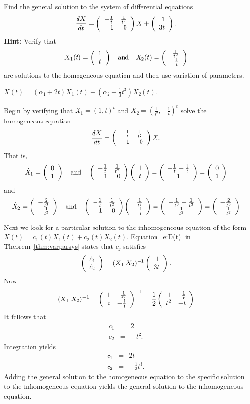 \documentclass{ximera}
\begin{document}
\begin{exercise}  \label{c17.3.3}
Find the general solution to the system of differential equations
\[
\frac{dX}{dt}= \left(\begin{array}{rr} -\frac{1}{t} & \frac{1}{t^2}\\ 1 &0\end{array}\right)X+\left(\begin{array}{r} 1 \\ 3t\end{array}\right).
\]
{\bf Hint:} Verify that 
\[
X_1(t) = \left(\begin{array}{c} 1 \\ t\end{array}\right) \quad\mbox{and}\quad X_2(t) = \left(\begin{array}{r} \frac{1}{t^2} \\ -\frac{1}{t}\end{array}\right)
\]
are solutions to the homogeneous equation and then use variation of parameters.

\begin{solution}
\ans $X(t) = (\alpha_1+2t)X_1(t) + 
\left(\alpha_2-\frac{1}{3}t^3 \right)X_2(t)$.

\soln  Begin by verifying that $X_1=(1,t)^t$ and 
$X_2=(\frac{1}{t^2},-\frac{1}{t})^t$ solve the homogeneous
equation
\[
\frac{dX}{dt}= \left(\begin{array}{rr} -\frac{1}{t} & \frac{1}{t^2}\\ 1 &0\end{array}\right)X.
\]
That is,
\[
\dot{X}_1 = \left(\begin{array}{c} 0 \\ 1\end{array}\right) \quad\mbox{and}\quad 
\left(\begin{array}{rr} -\frac{1}{t} & \frac{1}{t^2}\\ 1 &0\end{array}\right)\left(\begin{array}{c} 1 \\ t\end{array}\right) = 
\left(\begin{array}{c} -\frac{1}{t}+\frac{1}{t} \\ 1\end{array}\right) = \left(\begin{array}{c} 0 \\ 1\end{array}\right)
\]
and 
\[
\dot{X}_2 = \left(\begin{array}{r} -\frac{2}{t^3} \\ \frac{1}{t^2}\end{array}\right) \quad\mbox{and}\quad 
\left(\begin{array}{rr} -\frac{1}{t} & \frac{1}{t^2}\\ 1 &0\end{array}\right)
\left(\begin{array}{r} \frac{1}{t^2} \\ -\frac{1}{t}\end{array}\right) = 
\left(\begin{array}{c} -\frac{1}{t^3}-\frac{1}{t^3} \\ \frac{1}{t^2}\end{array}\right) 
= \left(\begin{array}{r} -\frac{2}{t^3} \\ \frac{1}{t^2}\end{array}\right)
\]

Next we look for a particular solution to the inhomogeneous equation of 
the form $X(t)=c_1(t)X_1(t)+c_2(t)X_2(t)$.  Equation~\eqref{e:D(t)} in
Theorem~\ref{thm:varparsys} states that $c_j$ satisfies
\[
\left(\begin{array}{r} \dot{c}_1 \\ \dot{c}_2\end{array}\right) = (X_1|X_2)^{-1} \left(\begin{array}{r} 1 \\ 3t\end{array}\right).
\]
Now 
\[
(X_1|X_2)^{-1} = \left(\begin{array}{rr} 1 & \frac{1}{t^2}\\ t &-\frac{1}{t}\end{array}\right)^{-1} = 
\frac{1}{2}\left(\begin{array}{rr} 1 & \frac{1}{t}\\ t^2 &-t\end{array}\right)
\]
It follows that 
\begin{eqnarray*}
\dot{c}_1 & = & 2 \\
\dot{c}_2 & = & -t^2.
\end{eqnarray*}
Integration yields
\begin{eqnarray*} 
c_1 & = & 2t\\
c_2 & = & -\frac{1}{3}t^3.
\end{eqnarray*}
Adding the general solution to the homogeneous equation to the specific
solution to the inhomogeneous equation yields the general solution to the
inhomogeneous equation.


\end{solution}
\end{exercise}
\end{document}
